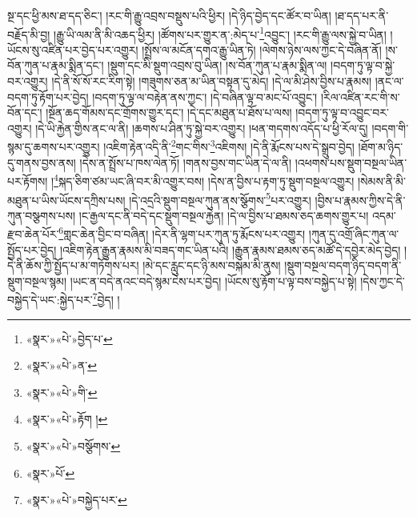 སྔ་དང་ཕྱི་མས་ཐ་དད་ཅིང་། །རང་གི་རྒྱུ་འབྲས་བསྡུས་པའི་ཕྱིར། །དེ་ཉིད་བྱེད་དང་ཚོར་བ་ཡིན། །ཐ་དད་པར་ནི་བརྗོད་མི་བྱ། །རྒྱུ་ཡི་ལམ་ནི་མི་འཆད་ཕྱིར། །ཚོགས་པར་གྱུར་ན་:མེད་པ་\footnote{«སྣར་»«པེ་»བྱེད་པ་}འབྱུང་། །རང་གི་རྒྱུ་ལས་སྐྱེ་བ་ཡིན། །ཡོངས་སུ་འཛིན་པར་བྱེད་པར་འགྱུར། །སྤྲོས་ལ་མངོན་དགའ་རྒྱུ་ཡིན་ཏེ། །ལེགས་ཉེས་ལས་ཀྱང་དེ་བཞིན་ནོ། །ས་བོན་ཀུན་པ་རྣམ་སྨིན་དང་། །སྡུག་དང་མི་སྡུག་འབྲས་བུ་ཡིན། །ས་བོན་ཀུན་པ་རྣམ་སྨིན་ལ། །བདག་ཏུ་ལྟ་བ་སྐྱེ་བར་འགྱུར། །དེ་ནི་སོ་སོ་རང་རིག་སྟེ། །གཟུགས་ཅན་མ་ཡིན་བསྟན་དུ་མེད། །དེ་ལ་མི་ཤེས་བྱིས་པ་རྣམས། །ནང་ལ་བདག་ཏུ་རྟོག་པར་བྱེད། །བདག་ཏུ་ལྟ་ལ་བརྟེན་ནས་ཀྱང་། །དེ་བཞིན་ལྟ་བ་མང་པོ་འབྱུང་། །རིལ་འཛིན་རང་གི་ས་བོན་དང་། །སྔོན་ཆད་གོམས་དང་གྲོགས་གྱུར་དང་། །དེ་དང་མཐུན་པ་ཐོས་པ་ལས། །བདག་ཏུ་ལྟ་བ་འབྱུང་བར་འགྱུར། །དེ་ཡི་རྐྱེན་གྱིས་ནང་ལ་ནི། །ཆགས་པ་ཤིན་ཏུ་སྐྱེ་བར་འགྱུར། །ཕན་གདགས་འདོད་པ་ཕྱི་རོལ་དུ། །བདག་གི་སྙམ་དུ་ཆགས་པར་འགྱུར། །འཇིག་རྟེན་འདི་ནི་\footnote{«སྣར་»«པེ་»ན་}གང་གིས་\footnote{«སྣར་»«པེ་»གི་}འཇིགས། །དེ་ནི་རྨོངས་པས་དེ་སྒྲུབ་བྱེད། །ཐོག་མ་ཉིད་དུ་གནས་བྱས་ནས། །དེས་ན་སྤྲོས་པ་ཁས་ལེན་ཏོ། །གནས་བྱས་གང་ཡིན་དེ་ལ་ནི། །འཕགས་པས་སྡུག་བསྔལ་ཡིན་པར་རྟོགས། །\footnote{«སྣར་»«པེ་»རྟོག །}སྐད་ཅིག་ཙམ་ཡང་ཞི་བར་མི་འགྱུར་བས། །དེས་ན་བྱིས་པ་རྟག་ཏུ་སྡུག་བསྔལ་འགྱུར། །སེམས་ནི་མི་མཐུན་པ་ཡིས་ཡོངས་དཀྲིས་པས། །དེ་འདྲའི་སྡུག་བསྔལ་ཀུན་ནས་སྩོགས་\footnote{«སྣར་»«པེ་»བསྩོགས་}པར་འགྱུར། །བྱིས་པ་རྣམས་ཀྱིས་དེ་ནི་ཀུན་བསྩགས་པས། །ང་རྒྱལ་དང་ནི་བདེ་དང་སྡུག་བསྔལ་རྐྱེན། །དེ་ལ་བྱིས་པ་ཐམས་ཅད་ཆགས་གྱུར་པ། འདམ་རྫབ་ཆེན་པོར་\footnote{«སྣར་»པོ་}གླང་ཆེན་བྱིང་བ་བཞིན། །དེར་ནི་ལྷག་པར་ཀུན་ཏུ་རྨོངས་པར་འགྱུར། །ཀུན་དུ་འགྲོ་ཞིང་ཀུན་ལ་སྤྱོད་པར་བྱེད། །འཇིག་རྟེན་རྒྱུན་རྣམས་མི་བཟད་གང་ཡིན་པའི། །རྒྱུན་རྣམས་ཐམས་ཅད་མཚོ་དེ་དབྱེར་མེད་བྱེད། །དེ་ནི་ཆོས་ཀྱི་སྤྱོད་པ་མ་གཏོགས་པར། །མེ་དང་རླུང་དང་ཉི་མས་བསྐམ་མི་ནུས། །སྡུག་བསྔལ་བདག་ཉིད་བདག་ནི་སྡུག་བསྔལ་སྙམ། །ཡང་ན་བདེ་ནའང་བདེ་སྙམ་ངེས་པར་བྱེད། །ཡོངས་སུ་རྟོག་པ་ལྟ་བས་བསྐྱེད་པ་སྟེ། །དེས་ཀྱང་དེ་བསྐྱེད་དེ་ཡང་:སྐྱེད་པར་\footnote{«སྣར་»«པེ་»བསྐྱེད་པར་}བྱེད། །
